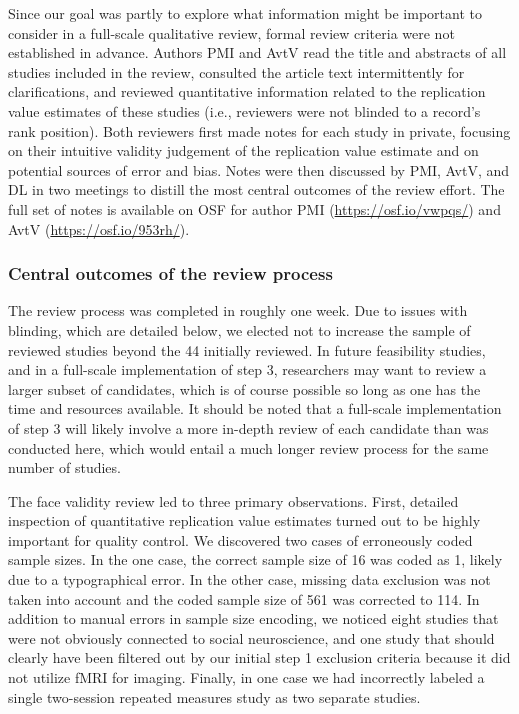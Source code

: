 \documentclass[
  english,
  man,floatsintext]{apa6}
\begin{document}
Since our goal was partly to explore what information might be important to consider in a full-scale qualitative review, formal review criteria were not established in advance. Authors PMI and AvtV read the title and abstracts of all studies included in the review, consulted the article text intermittently for clarifications, and reviewed quantitative information related to the replication value estimates of these studies (i.e., reviewers were not blinded to a record's rank position). Both reviewers first made notes for each study in private, focusing on their intuitive validity judgement of the replication value estimate and on potential sources of error and bias. Notes were then discussed by PMI, AvtV, and DL in two meetings to distill the most central outcomes of the review effort. The full set of notes is available on OSF for author PMI (\url{https://osf.io/vwpqs/}) and AvtV (\url{https://osf.io/953rh/}).

\hypertarget{central-outcomes-of-the-review-process}{%
\subsubsection{Central outcomes of the review process}\label{central-outcomes-of-the-review-process}}

The review process was completed in roughly one week. Due to issues with blinding, which are detailed below, we elected not to increase the sample of reviewed studies beyond the 44 initially reviewed. In future feasibility studies, and in a full-scale implementation of step 3, researchers may want to review a larger subset of candidates, which is of course possible so long as one has the time and resources available. It should be noted that a full-scale implementation of step 3 will likely involve a more in-depth review of each candidate than was conducted here, which would entail a much longer review process for the same number of studies.

The face validity review led to three primary observations. First, detailed inspection of quantitative replication value estimates turned out to be highly important for quality control. We discovered two cases of erroneously coded sample sizes. In the one case, the correct sample size of 16 was coded as 1, likely due to a typographical error. In the other case, missing data exclusion was not taken into account and the coded sample size of 561 was corrected to 114. In addition to manual errors in sample size encoding, we noticed eight studies that were not obviously connected to social neuroscience, and one study that should clearly have been filtered out by our initial step 1 exclusion criteria because it did not utilize fMRI for imaging. Finally, in one case we had incorrectly labeled a single two-session repeated measures study as two separate studies.
\end{document}
